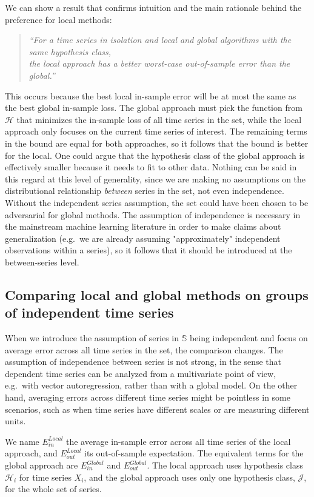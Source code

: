 \documentclass[a4paper]{article}
\theoremstyle{custom}
\begin{document}
We can show a result that confirms intuition and the main rationale behind the preference for local methods:
\begin{quote}\itshape
``For a time series in isolation and local and global algorithms with the same hypothesis class,\\
the local approach has a better worst-case out-of-sample error than the global.''
\end{quote}
This occurs because the best local in-sample error will be at most the same as the best global in-sample loss.
The global approach must pick the function from $\mathcal{H}$ that minimizes the in-sample loss of all time series in the set, while the local approach only focuses on the current time series of interest. The remaining terms in the bound are equal for both approaches, so it follows that the bound is better for the local. One could argue that the hypothesis class of the global approach is effectively smaller because it needs to fit to other data. Nothing can be said in this regard at this level of generality, since we are making no assumptions on the distributional relationship \textit{between} series in the set, not even independence. Without the independent series assumption, the set could have been chosen to be adversarial for global methods.
The assumption of independence is necessary in the mainstream machine learning literature in order to make claims about generalization (e.g.\ we are already assuming "approximately" independent observations within a series), so it follows that it should be introduced at the between-series level.

\subsection{Comparing local and global methods on groups of independent time series}

When we introduce the assumption of series in $\mathbb{S}$ being independent and focus on average error across all time series in the set, the comparison changes. The assumption of independence between series is not strong, in the sense that dependent time series can be analyzed from a multivariate point of view, e.g.\ with vector autoregression, rather than with a global model. On the other hand, averaging errors across different time series might be pointless in some scenarios, such as when time series have different scales or are measuring different units.

We name $E_{\textit{in}}^{\textit{Local}}$ the average in-sample error across all time series of the local approach, and $E_{\textit{out}}^{\textit{Local}}$ its out-of-sample expectation.
The equivalent terms for the global approach are $E_{\textit{in}}^{\textit{Global}}$ and $E_{\textit{out}}^{\textit{Global}}$. The local approach uses hypothesis class $\mathcal{H}_i$ for time series $X_i$, and the global approach uses only one hypothesis class, ${\mathcal{J}}$, for the whole set of series.
\end{document}

